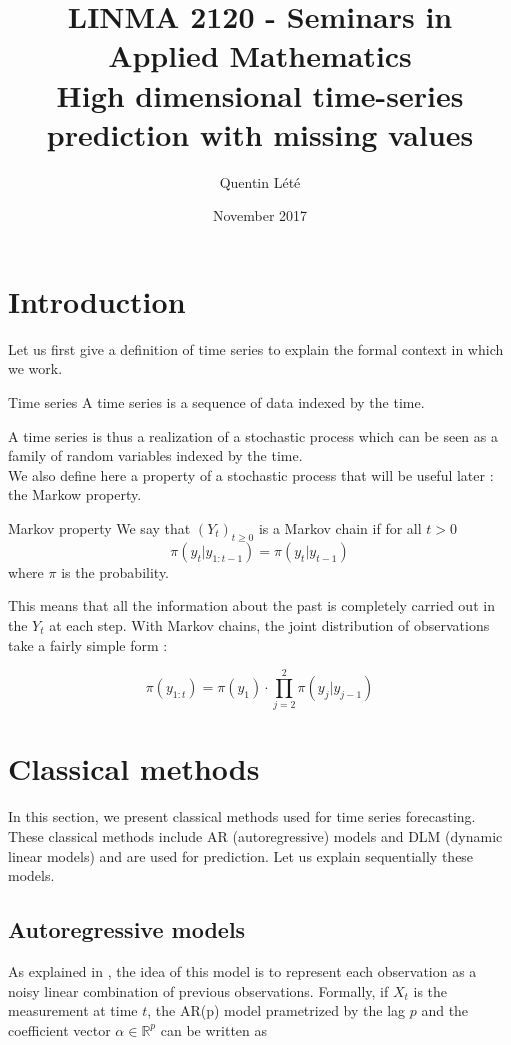 \documentclass{article}
\title{LINMA 2120 - Seminars in Applied Mathematics \\
        High dimensional time-series prediction with missing values}
\author{Quentin Lété}
\date{November 2017}
\begin{document}
\maketitle

\section{Introduction}

Let us first give a definition of time series to explain the formal context in which we work. \\

\theoremstyle{definition}
\begin{definition}{Time series}
A time series is a sequence of data indexed by the time.
\end{definition}

A time series is thus a realization of a stochastic process which can be seen as a family of random variables indexed by the time. \\

We also define here a property of a stochastic process that will be useful later : the Markow property. \\

\begin{definition}{Markov property}
We say that $(Y_t)_{t \ge 0}$ is a Markov chain if for all $t > 0$
$$\pi(y_t|y_{1:t-1}) = \pi(y_t|y_{t-1})$$
where $\pi$ is the probability.
\end{definition}

This means that all the information about the past is completely carried out in the $Y_t$ at each step. With Markov chains, the joint distribution of observations take a fairly simple form :

$$\pi(y_{1:t}) = \pi(y_1) \cdot \prod_{j=2}^2 \pi(y_j|y_{j-1})$$

\section*{Classical methods}
In this section, we present classical methods used for time series forecasting.
These classical methods include AR (autoregressive) models and DLM (dynamic linear models) and are used for prediction.
Let us explain sequentially these models.

\subsection*{Autoregressive models}
As explained in \cite{pmlr-v37-anava15}, the idea of this model is to represent each observation as a noisy linear combination of previous observations.
Formally, if $X_t$ is the measurement at time $t$, the AR(p) model prametrized by the lag $p$ and the coefficient vector $\alpha \in \mathbb{R}^p$ can be written as
\end{document}
